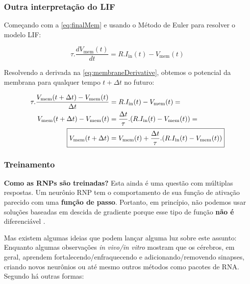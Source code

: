 			
		\subsubsection{Outra interpretação do LIF}
			
			\par Começando com a \autoref{eq:finalMem} e usando o Método de Euler para resolver o modelo LIF:
			
			\begin{equation}
				\tau.\dfrac{dV_{\text{mem}}(t)}{dt} = R.I_{\text{in}}(t) - V_{\text{mem}}(t)
			\end{equation}
			
			\par Resolvendo a derivada na \autoref{eq:membraneDerivative}, obtemos o potencial da membrana para qualquer tempo $t+\Delta t$ no futuro:
			
			\begin{equation}
				\label{eq:membraneDerivative}
				\begin{aligned}
					\tau.\dfrac{V_{\text{mem}}(t+\Delta t) - V_{\text{mem}}(t)}{\Delta t} &= R.I_{\text{in}}(t) - V_{\text{mem}}(t) = \\
					V_{\text{mem}}(t+\Delta t) - V_{\text{mem}}(t) &= \frac{\Delta t}{\tau} . (R.I_{\text{in}}(t) - V_{\text{mem}}(t)) = \\
					\Aboxed{V_{\text{mem}}(t+\Delta t) &= V_{\text{mem}}(t) + \frac{\Delta t}{\tau} . (R.I_{\text{in}}(t) - V_{\text{mem}}(t))}
				\end{aligned}
			\end{equation}

		\subsubsection{Treinamento}
		
			\par \textbf{Como as RNPs são treinadas?} Esta ainda é uma questão com múltiplas respostas. Um neurônio RNP tem o comportamento de sua função de ativação parecido com uma \textbf{função de passo}. Portanto, em princípio, não podemos usar soluções baseadas em descida de gradiente porque esse tipo de função \textbf{não é} diferenciável \cite{kasabov2019time}.
			
			\par Mas existem algumas ideias que podem lançar alguma luz sobre este assunto: Enquanto algumas observações \textit{in vivo/in vitro} mostram que os cérebros, em geral, aprendem fortalecendo/enfraquecendo e adicionando/removendo sinapses, criando novos neurônios ou até mesmo outros métodos como pacotes de RNA. Segundo \cite{kasabov2019time} há outras formas:
			
